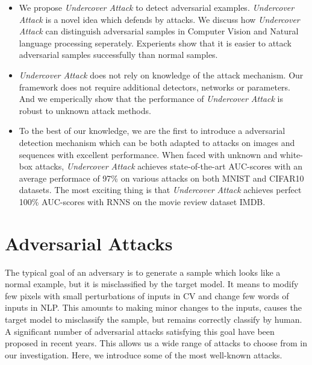 \documentclass{article}
\begin{document}
\begin{itemize}

  \item We propose \emph{Undercover Attack} to detect adversarial examples. \emph{Undercover Attack} is a novel idea which defends by attacks. We discuss how \emph{Undercover Attack} can distinguish adversarial samples in Computer Vision and Natural language processing seperately. Experients show that it is easier to attack adversarial samples successfully than normal samples.

  \item \emph{Undercover Attack} does not rely on knowledge of the attack mechanism. Our framework does not require additional detectors, networks or parameters. And we emperically show that the performance of \emph{Undercover Attack} is robust to unknown attack methods.

  \item  To the best of our knowledge, we are the first to introduce a adversarial detection mechanism which can be both adapted to attacks on images and sequences with excellent performance. When faced with unknown and white-box attacks, \emph{Undercover Attack} achieves state-of-the-art AUC-scores with an average performace of 97\% on various attacks on both MNIST and CIFAR10 datasets. The most exciting thing is that \emph{Undercover Attack} achieves perfect 100\% AUC-scores with RNNS on the movie review dataset IMDB.



\end{itemize}

\section{Adversarial Attacks}

The typical goal of an adversary is to generate a sample which looks like a normal example, but it is misclassified by the target model. It means to modify few pixels with small perturbations of inputs in CV and change few words of inputs in NLP. This amounts to making minor changes to the inputs, causes the target model to misclassify the sample, but remains correctly classify by human. A significant number of adversarial attacks satisfying this goal have been proposed in recent years. This allows us a wide range of attacks to choose from in our investigation. Here, we introduce some of the most well-known attacks.
\end{document}
